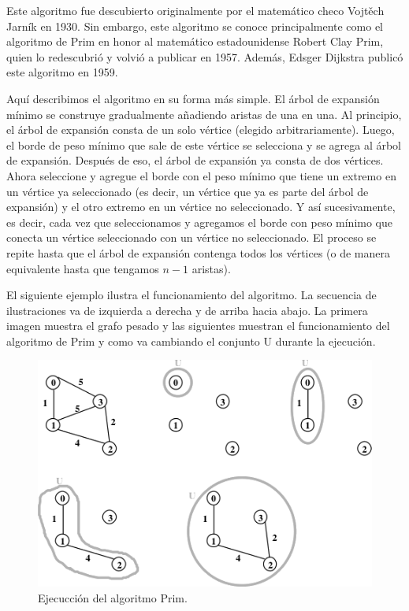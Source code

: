 Este algoritmo fue descubierto originalmente por el matemático checo Vojtěch Jarník en 1930. Sin embargo, este algoritmo se conoce principalmente como el algoritmo de Prim en honor al matemático estadounidense Robert Clay Prim, quien lo redescubrió y volvió a publicar en 1957. Además, Edsger Dijkstra publicó este algoritmo en 1959.

Aquí describimos el algoritmo en su forma más simple. El árbol de expansión mínimo se construye gradualmente añadiendo aristas de una en una. Al principio, el árbol de expansión consta de un solo vértice (elegido arbitrariamente). Luego, el borde de peso mínimo que sale de este vértice se selecciona y se agrega al árbol de expansión. Después de eso, el árbol de expansión ya consta de dos vértices. Ahora seleccione y agregue el borde con el peso mínimo que tiene un extremo en un vértice ya seleccionado (es decir, un vértice que ya es parte del árbol de expansión) y el otro extremo en un vértice no seleccionado. Y así sucesivamente, es decir, cada vez que seleccionamos y agregamos el borde con peso mínimo que conecta un vértice seleccionado con un vértice no seleccionado. El proceso se repite hasta que el árbol de expansión contenga todos los vértices (o de manera equivalente hasta que tengamos $n-1$ aristas).

El siguiente ejemplo ilustra el funcionamiento del algoritmo. La secuencia de
ilustraciones va de izquierda a derecha y de arriba hacia abajo. La primera imagen muestra el grafo pesado y las siguientes muestran el funcionamiento del algoritmo de Prim y como va cambiando el conjunto U durante la ejecución.

\begin{figure}[!h]
	\centering 
	\includegraphics[scale=0.5]{img/ejecuccion_prim}
	\caption{Ejecucción del algoritmo Prim.}
	\label{contexto:figura}
\end{figure}

